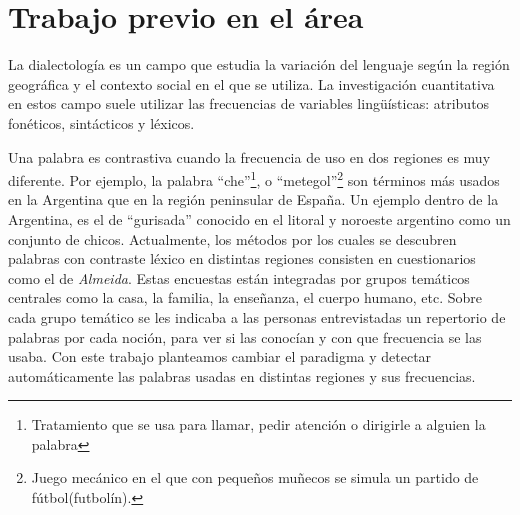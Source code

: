 




\section{Trabajo previo en el área}
La dialectología es un campo que estudia la variación del lenguaje según la región geográfica y el contexto social en el que se utiliza. La investigación cuantitativa en estos campo suele utilizar las frecuencias de variables lingüísticas: atributos fonéticos, sintácticos y léxicos.

Una palabra es contrastiva cuando la frecuencia de uso en dos regiones es muy diferente. Por ejemplo, la palabra ``che''\footnote{Tratamiento que se usa para llamar, pedir atención o dirigirle a alguien la palabra\cite{academia2008diccionario}}, o ``metegol''\footnote{Juego mecánico en el que con pequeños muñecos se simula un partido de fútbol(futbolín)\cite{academia2008diccionario}.} son términos más usados en la Argentina que en la región peninsular de España. Un ejemplo dentro de la Argentina, es el de ``gurisada'' conocido en el litoral y noroeste argentino como un conjunto de chicos\cite{academia2008diccionario}.
Actualmente, los métodos por los cuales se descubren palabras con contraste léxico en distintas regiones
consisten en cuestionarios como el de \emph{Almeida}\cite{almeida1995variacion}.  Estas encuestas están integradas por grupos temáticos centrales como la casa, la familia, la enseñanza, el cuerpo humano, etc. Sobre cada grupo temático se les indicaba a las personas entrevistadas un repertorio de palabras por cada noción, para ver si las conocían y con que frecuencia se las usaba. 
Con este trabajo planteamos cambiar el paradigma y detectar automáticamente las palabras usadas en distintas regiones y sus frecuencias.

